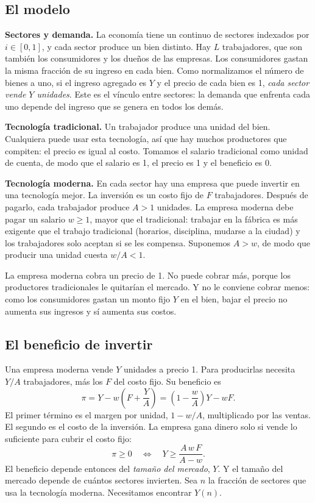 \documentclass[12pt,letterpaper]{article}
\begin{document}
\subsection{El modelo}

\textbf{Sectores y demanda.} La economía tiene un continuo de sectores indexados por $i\in[0,1]$, y cada sector produce un bien distinto. Hay $L$ trabajadores, que son también los consumidores y los dueños de las empresas. Los consumidores gastan la misma fracción de su ingreso en cada bien. Como normalizamos el número de bienes a uno, si el ingreso agregado es $Y$ y el precio de cada bien es 1, \emph{cada sector vende $Y$ unidades}. Este es el vínculo entre sectores: la demanda que enfrenta cada uno depende del ingreso que se genera en todos los demás.

\textbf{Tecnología tradicional.} Un trabajador produce una unidad del bien. Cualquiera puede usar esta tecnología, así que hay muchos productores que compiten: el precio es igual al costo. Tomamos el salario tradicional como unidad de cuenta, de modo que el salario es 1, el precio es 1 y el beneficio es 0.

\textbf{Tecnología moderna.} En cada sector hay una empresa que puede invertir en una tecnología mejor. La inversión es un costo fijo de $F$ trabajadores. Después de pagarlo, cada trabajador produce $A>1$ unidades. La empresa moderna debe pagar un salario $w\geq1$, mayor que el tradicional: trabajar en la fábrica es más exigente que el trabajo tradicional (horarios, disciplina, mudarse a la ciudad) y los trabajadores solo aceptan si se les compensa. Suponemos $A>w$, de modo que producir una unidad cuesta $w/A<1$.

La empresa moderna cobra un precio de 1. No puede cobrar más, porque los productores tradicionales le quitarían el mercado. Y no le conviene cobrar menos: como los consumidores gastan un monto fijo $Y$ en el bien, bajar el precio no aumenta sus ingresos y sí aumenta sus costos.

\subsection{El beneficio de invertir}

Una empresa moderna vende $Y$ unidades a precio 1. Para producirlas necesita $Y/A$ trabajadores, más los $F$ del costo fijo. Su beneficio es
\begin{equation}\label{eq:pi}
  \pi=Y-w\left(F+\frac{Y}{A}\right)=\left(1-\frac{w}{A}\right)Y-wF .
\end{equation}
El primer término es el margen por unidad, $1-w/A$, multiplicado por las ventas. El segundo es el costo de la inversión. La empresa gana dinero solo si vende lo suficiente para cubrir el costo fijo:
\[
  \pi\geq0\quad\Longleftrightarrow\quad Y\geq\frac{A\,w\,F}{A-w}.
\]
El beneficio depende entonces del \emph{tamaño del mercado}, $Y$. Y el tamaño del mercado depende de cuántos sectores invierten. Sea $n$ la fracción de sectores que usa la tecnología moderna. Necesitamos encontrar $Y(n)$.
\end{document}
